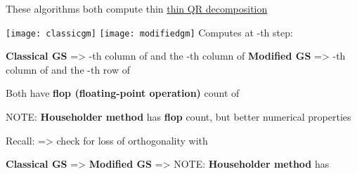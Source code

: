 \begin{itemize}

      \vItem
            These algorithms both compute thin \ul{thin QR decomposition}

            \texttt{[image: classicgm]}
            \texttt{[image: modifiedgm]}
      \vItem
            Computes at -th step:

            \begin{itemize}

                  \vItem
                        \textbf{Classical GS} => -th column of
                         and the -th column of 
                  \vItem
                        \textbf{Modified GS} => -th column of
                         and the -th row of 
            \end{itemize}
      \vItem
            Both have \textbf{flop (floating-point operation)} count of

            \begin{itemize}

                  \vItem
                        NOTE: \textbf{Householder method} has
                         \textbf{flop} count,
                        but better numerical properties
            \end{itemize}
      \vItem
            Recall:  =>
            check for loss of orthogonality with

            \begin{itemize}

                  \vItem
                        \textbf{Classical GS} =>
                  \vItem
                        \textbf{Modified GS} =>
                  \vItem
                        NOTE: \textbf{Householder method} has
            \end{itemize}
\end{itemize}

